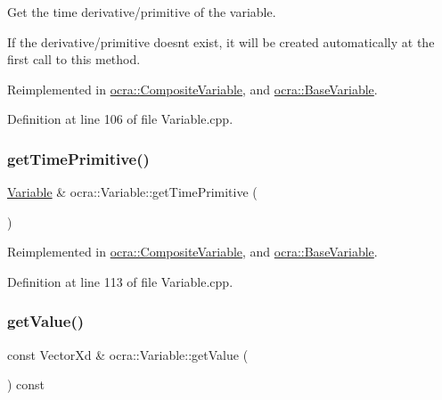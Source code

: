 Get the time derivative/primitive of the variable. 

If the derivative/primitive doesn\textquotesingle{}t exist, it will be created automatically at the first call to this method. 

Reimplemented in \hyperlink{classocra_1_1CompositeVariable_ad4c753d254356c1b3686a3da04b0d499}{ocra\+::\+Composite\+Variable}, and \hyperlink{classocra_1_1BaseVariable_a79a86d7415d8b460ad9f526f685961dc}{ocra\+::\+Base\+Variable}.



Definition at line 106 of file Variable.\+cpp.

\hypertarget{classocra_1_1Variable_aca32d63e60dc79de340b2f122dad0dc5}{}\label{classocra_1_1Variable_aca32d63e60dc79de340b2f122dad0dc5} 
\subsubsection{\texorpdfstring{get\+Time\+Primitive()}{getTimePrimitive()}}
{\footnotesize\ttfamily \hyperlink{classocra_1_1Variable}{Variable} \& ocra\+::\+Variable\+::get\+Time\+Primitive (\begin{DoxyParamCaption}{ }\end{DoxyParamCaption})\hspace{0.3cm}{\ttfamily [virtual]}}



Reimplemented in \hyperlink{classocra_1_1CompositeVariable_a7870c51e9904734593d7990033a7cca4}{ocra\+::\+Composite\+Variable}, and \hyperlink{classocra_1_1BaseVariable_aa985b0703fc0a2edcd66a7c4c4ee05e4}{ocra\+::\+Base\+Variable}.



Definition at line 113 of file Variable.\+cpp.

\hypertarget{classocra_1_1Variable_abd572fbe8e7429058617d277fd540874}{}\label{classocra_1_1Variable_abd572fbe8e7429058617d277fd540874} 
\subsubsection{\texorpdfstring{get\+Value()}{getValue()}}
{\footnotesize\ttfamily const Vector\+Xd \& ocra\+::\+Variable\+::get\+Value (\begin{DoxyParamCaption}{ }\end{DoxyParamCaption}) const}




